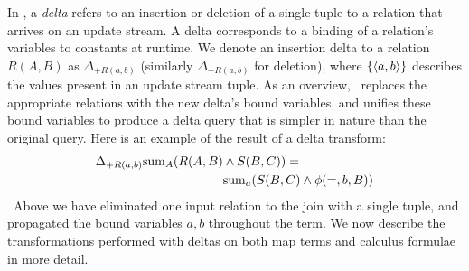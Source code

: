 In \compiler, a \textit{delta} refers to an insertion or deletion of a single
tuple to a relation that arrives on an update stream. A delta corresponds to a
binding of a relation's variables to constants at runtime. We denote an
insertion delta to a relation $R(A,B)$ as $\Delta_{+R(a,b)}$ (similarly
$\Delta_{-R(a,b)}$ for deletion), where $\{{\langle a,b\rangle}\}$ describes the values
present in an update stream tuple. As an overview, \compiler\ replaces the
appropriate relations with the new delta's bound variables, and unifies these
bound variables to produce a delta query that is simpler in nature than the
original query.
Here is an example of the result of a delta transform:
\begin{align*}
\Delta_{+R(a,b)} \mathrm{sum}_{A}(R(A,B) & \wedge S(B,C)) =\\
& \mathrm{sum}_{a}(S(B,C) \wedge \phi(=,b,B))
\end{align*}
\noindent~Above we have eliminated one input relation to the join
with a single tuple, and propagated the bound variables $a,b$ throughout the
term.  We now describe the transformations performed with deltas on both map
terms and calculus formulae in more detail.

